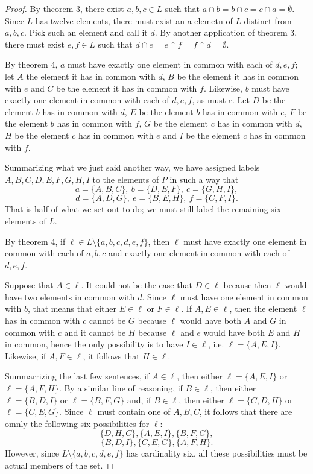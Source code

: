 \documentclass[12pt]{article}
\begin{document}
\begin{proof}
By theorem 3, there exist $a,b,c \in L$ such that
$a \cap b = b \cap c = c \cap a = \emptyset$.  Since $L$ has
twelve elements, there must exist an a elemetn of $L$ distinct
from $a,b,c$.  Pick such an element and call it $d$.  By 
another application of theorem 3, there must exist $e,f \in L$ 
such that $d \cap e = e \cap f = f \cap d = \emptyset$.

By theorem 4, $a$ must have exactly one element in common with 
each of $d,e,f$; let $A$ the element it has in common with $d$,
$B$ be the element it has in common with $e$ and $C$ be the 
element it has in common with $f$.  Likewise, $b$ must have 
exactly one element in common with each of $d,e,f$, as must $c$.
Let $D$ be the element $b$ has in common with $d$, $E$ be the
element $b$ has in common with $e$, $F$ be the element $b$
has in common with $f$, $G$ be the element $c$ has in common 
with $d$, $H$ be the element $c$ has in common with $e$ and $I$
be the element $c$ has in common with $f$.

Summarizing what we just said another way, we have assigned
labels $A,B,C,D,E,F,G,H,I$ to the elements of $P$ in such
a way that 
\[ a = \{A,B,C\}, ~ b = \{D,E,F\}, ~ c = \{G,H,I\}, \]
\[ d = \{A,D,G\}, ~ e = \{B,E,H\}, ~ f = \{C,F,I\}. \]
That is half of what we set out to do; we must still label
the remaining six elements of $L$.

By theorem 4, if $\ell \in L \setminus \{a,b,c,d,e,f\}$, then
$\ell$ must have exactly one element in common with each of 
$a,b,c$ and exactly one element in common with each of $d,e,f$.

Suppose that $A \in \ell$.  It could not be the case that 
$D \in \ell$ because then $\ell$ would have two elements in 
common with $d$.  Since $\ell$ must have one element in common
with $b$, that means that either $E \in \ell$ or $F \in \ell$.
If $A,E \in \ell$, then the element $\ell$ has in common with 
$c$ cannot be $G$ because $\ell$ would have both $A$ and $G$
in common with $c$ and it cannot be $H$ because $\ell$ and
$e$ would have both $E$ and $H$ in common, hence the only
possibility is to have $I \in \ell$, i.e. $\ell = \{A,E,I\}$.
Likewise, if $A,F \in \ell$, it follows that $H \in \ell$.

Summarrizing the last few sentences, if $A \in \ell$, then
either $\ell = \{A,E,I\}$ or $\ell = \{A,F,H\}$.  By a similar
line of reasoning, if $B \in \ell$, then either $\ell = 
\{B,D,I\}$ or $\ell = \{B,F,G\}$ and, if $B \in \ell$, then 
either $\ell = \{C,D,H\}$ or $\ell = \{C,E,G\}$.  Since $\ell$
must contain one of $A,B,C$, it follows that there are omnly
the following six possibilities for $\ell$:
\[\{D,H,C\}, \{A,E,I\}, \{B,F,G\}, \]
\[\{B,D,I\}, \{C,E,G\}, \{A,F,H\}. \]
However, since $L \setminus \{a,b,c,d,e,f\}$ has cardinality
six, all these possibilities must be actual members of the set.
\end{proof}
\end{document}
